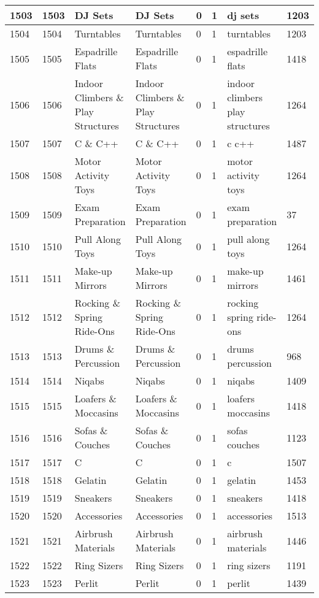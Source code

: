 \begin{longtable}{|l|l|l|l|l|l|l|l|}
1503 & 1503 & DJ Sets & DJ Sets & 0 & 1 & dj sets & 1203 \\ \hline 
1504 & 1504 & Turntables & Turntables & 0 & 1 & turntables & 1203 \\ \hline 
1505 & 1505 & Espadrille Flats & Espadrille Flats & 0 & 1 & espadrille flats & 1418 \\ \hline 
1506 & 1506 & Indoor Climbers \& Play Structures & Indoor Climbers \& Play Structures & 0 & 1 & indoor climbers play structures & 1264 \\ \hline 
1507 & 1507 & C \& C++ & C \& C++ & 0 & 1 & c c++ & 1487 \\ \hline 
1508 & 1508 & Motor Activity Toys & Motor Activity Toys & 0 & 1 & motor activity toys & 1264 \\ \hline 
1509 & 1509 & Exam Preparation & Exam Preparation & 0 & 1 & exam preparation & 37 \\ \hline 
1510 & 1510 & Pull Along Toys & Pull Along Toys & 0 & 1 & pull along toys & 1264 \\ \hline 
1511 & 1511 & Make-up Mirrors & Make-up Mirrors & 0 & 1 & make-up mirrors & 1461 \\ \hline 
1512 & 1512 & Rocking \& Spring Ride-Ons & Rocking \& Spring Ride-Ons & 0 & 1 & rocking spring ride-ons & 1264 \\ \hline 
1513 & 1513 & Drums \& Percussion & Drums \& Percussion & 0 & 1 & drums percussion & 968 \\ \hline 
1514 & 1514 & Niqabs & Niqabs & 0 & 1 & niqabs & 1409 \\ \hline 
1515 & 1515 & Loafers \& Moccasins & Loafers \& Moccasins & 0 & 1 & loafers moccasins & 1418 \\ \hline 
1516 & 1516 & Sofas \& Couches & Sofas \& Couches & 0 & 1 & sofas couches & 1123 \\ \hline 
1517 & 1517 & C & C & 0 & 1 & c & 1507 \\ \hline 
1518 & 1518 & Gelatin & Gelatin & 0 & 1 & gelatin & 1453 \\ \hline 
1519 & 1519 & Sneakers & Sneakers & 0 & 1 & sneakers & 1418 \\ \hline 
1520 & 1520 & Accessories & Accessories & 0 & 1 & accessories & 1513 \\ \hline 
1521 & 1521 & Airbrush Materials & Airbrush Materials & 0 & 1 & airbrush materials & 1446 \\ \hline 
1522 & 1522 & Ring Sizers & Ring Sizers & 0 & 1 & ring sizers & 1191 \\ \hline 
1523 & 1523 & Perlit & Perlit & 0 & 1 & perlit & 1439 \\ \hline 

\end{longtable}
